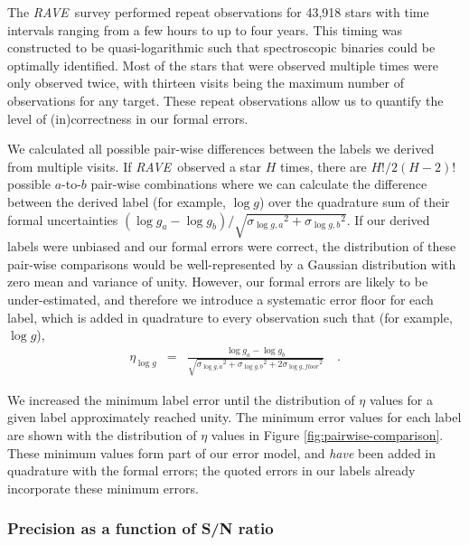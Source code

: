 \documentclass[preprint,trackchanges]{aastex}
\newcommand{\acronym}[1]{{\small{#1}}}
\newcommand{\project}[1]{\textsl{#1}}
\newcommand{\rave}{\project{\acronym{RAVE}}}
\newcommand{\logg}{\log g}
\begin{document}
The \rave\ survey performed repeat observations for 43,918 stars with time 
intervals ranging from a few hours to up to four years.  This timing was 
constructed to be quasi-logarithmic such that spectroscopic binaries could
be optimally identified. Most of the stars that were observed multiple times
were only observed twice, with thirteen visits being the maximum number 
of observations for any target.  These repeat observations allow us to 
quantify the level of (in)correctness in our formal errors.  


We calculated all possible pair-wise differences between the labels we
derived from multiple visits.  If \rave\ observed a star $H$ times, there 
are $H!/2(H-2)!$ possible $a$-to-$b$ pair-wise combinations where we can calculate 
the difference between the derived label (for example, $\logg$) over the
quadrature sum of their formal uncertainties $(\logg_a - \logg_b)/\sqrt{{\sigma_{\logg,a}}^2 + {\sigma_{\logg,b}}^2}$.  If our derived labels were unbiased and our formal
errors were correct, the distribution of these pair-wise comparisons would be
well-represented by a Gaussian distribution with zero mean and variance
of unity.  However, our formal errors are likely to be under-estimated,
and therefore we introduce a systematic error floor for each label, which
is added in quadrature to every observation such that (for example, $\logg$),
\begin{eqnarray}
	\eta_{\logg} & = & \frac{\logg_a - \logg_b}{\sqrt{{\sigma_{\logg,a}}^2 + {\sigma_{\logg,b}}^2 + 2{\sigma_{\logg,floor}}^2}} \quad .
\end{eqnarray}



We increased the minimum label error until the distribution of $\eta$ 
values for a given label approximately reached unity.  The minimum error
values for each label are shown with the distribution of $\eta$
values in Figure \ref{fig:pairwise-comparison}.  These minimum values form
part of our error model, and \emph{have} been added in quadrature with 
the formal errors; the quoted errors in our labels already incorporate
these minimum errors.


\subsubsection{Precision as a function of S/N ratio}
\label{sec:precision-wrt-snr}
\end{document}
